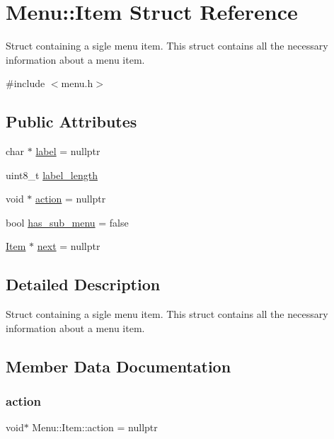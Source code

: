 \hypertarget{struct_menu_1_1_item}{}\section{Menu\+:\+:Item Struct Reference}
\label{struct_menu_1_1_item}


Struct containing a sigle menu item. This struct contains all the necessary information about a menu item.  




{\ttfamily \#include $<$menu.\+h$>$}

\subsection*{Public Attributes}
\begin{DoxyCompactItemize}
\item 
char $\ast$ \hyperlink{struct_menu_1_1_item_a378723382fc64c752a85ffe6fec9707e}{label} = nullptr
\item 
uint8\+\_\+t \hyperlink{struct_menu_1_1_item_a46749d046bbbde8d5308848d5394c2dc}{label\+\_\+length}
\item 
void $\ast$ \hyperlink{struct_menu_1_1_item_a247e140fed2addf80986ba5a3506b9dd}{action} = nullptr
\item 
bool \hyperlink{struct_menu_1_1_item_a5c9895a137458b9a12dafd447ac7430b}{has\+\_\+sub\+\_\+menu} = false
\item 
\hyperlink{struct_menu_1_1_item}{Item} $\ast$ \hyperlink{struct_menu_1_1_item_aadcc1e4e824296c6b72ac7d053f06869}{next} = nullptr
\end{DoxyCompactItemize}


\subsection{Detailed Description}
Struct containing a sigle menu item. This struct contains all the necessary information about a menu item. 

\subsection{Member Data Documentation}
\hypertarget{struct_menu_1_1_item_a247e140fed2addf80986ba5a3506b9dd}{}\label{struct_menu_1_1_item_a247e140fed2addf80986ba5a3506b9dd} 
\subsubsection{\texorpdfstring{action}{action}}
{\footnotesize\ttfamily void$\ast$ Menu\+::\+Item\+::action = nullptr}

